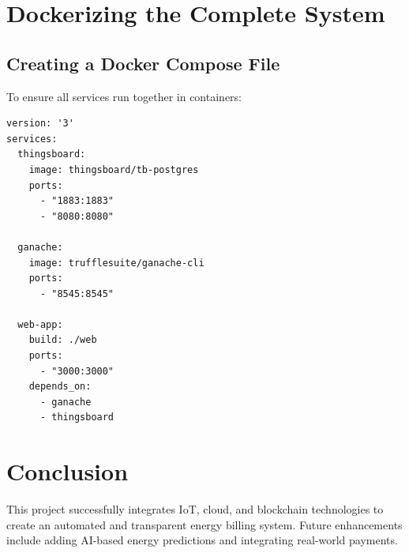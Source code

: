 \documentclass[a4paper,12pt]{report}
\begin{document}
\chapter{Dockerizing the Complete System}
\section{Creating a Docker Compose File}
To ensure all services run together in containers:
\begin{lstlisting}
version: '3'
services:
  thingsboard:
    image: thingsboard/tb-postgres
    ports:
      - "1883:1883"
      - "8080:8080"

  ganache:
    image: trufflesuite/ganache-cli
    ports:
      - "8545:8545"

  web-app:
    build: ./web
    ports:
      - "3000:3000"
    depends_on:
      - ganache
      - thingsboard
\end{lstlisting}

\chapter{Conclusion}
This project successfully integrates IoT, cloud, and blockchain technologies to create an automated and transparent energy billing system. Future enhancements include adding AI-based energy predictions and integrating real-world payments.

\newpage
\renewcommand{\bibname}{References}



\end{document}

